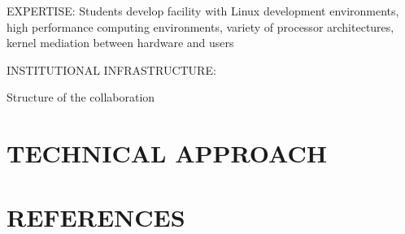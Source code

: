 \documentclass[11pt]{article}
\begin{document}
EXPERTISE:
Students develop facility with Linux development environments, high performance
computing environments, variety of processor architectures, kernel mediation between
hardware and users

INSTITUTIONAL INFRASTRUCTURE:

Structure of the collaboration

\section{TECHNICAL APPROACH}



\begingroup
\section{REFERENCES}
\printbibliography[heading=none]
\endgroup
\end{document}
